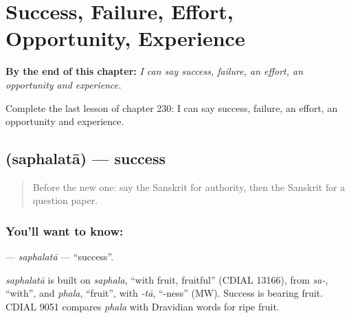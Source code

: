 
\chapter{Success, Failure, Effort, Opportunity, Experience}
\label{ch:sa-success-failure-effort-opportunity-experience}

\begin{chapteropening}
\textbf{By the end of this chapter:} \emph{I can say success, failure, an effort, an opportunity and experience.}

Complete the last lesson of chapter 230: I can say success, failure, an effort, an opportunity and experience.
\end{chapteropening}

\section[\texorpdfstring{\sk{सफलता} (saphalatā)}{सफलता (saphalatā)}]{ (saphalatā) — success}

\label{lesson:SA-C230-saphalata}



\begin{quote}
Before the new one: say the Sanskrit for authority, then the Sanskrit for a question paper.
\end{quote}

\subsection*{You'll want to know: }
\textbf{} — \emph{saphalatā} — \textquotedblleft{}success\textquotedblright{}.

\begin{cousinweb}
\emph{saphalatā} is built on \emph{saphala}, \textquotedblleft{}with fruit, fruitful\textquotedblright{} (CDIAL 13166), from \emph{sa-}, \textquotedblleft{}with\textquotedblright{}, and \emph{phala}, \textquotedblleft{}fruit\textquotedblright{}, with \emph{-tā}, \textquotedblleft{}-ness\textquotedblright{} (MW). Success is bearing fruit. CDIAL 9051 compares \emph{phala} with Dravidian words for ripe fruit.
\end{cousinweb}

